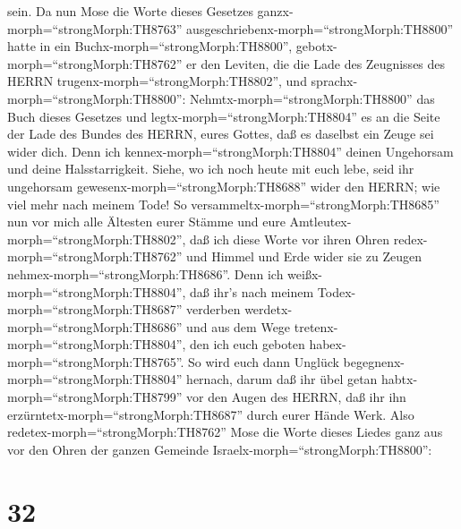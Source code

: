 sein.  Da nun Mose die Worte dieses Gesetzes
ganzx-morph=``strongMorph:TH8763''
ausgeschriebenx-morph=``strongMorph:TH8800'' hatte in ein
Buchx-morph=``strongMorph:TH8800'', 
gebotx-morph=``strongMorph:TH8762'' er den Leviten, die die Lade des
Zeugnisses des HERRN trugenx-morph=``strongMorph:TH8802'', und
sprachx-morph=``strongMorph:TH8800'': 
Nehmtx-morph=``strongMorph:TH8800'' das Buch dieses Gesetzes und
legtx-morph=``strongMorph:TH8804'' es an die Seite der Lade des Bundes
des HERRN, eures Gottes, daß es daselbst ein Zeuge sei wider dich.
 Denn ich kennex-morph=``strongMorph:TH8804'' deinen
Ungehorsam und deine Halsstarrigkeit. Siehe, wo ich noch heute mit euch
lebe, seid ihr ungehorsam gewesenx-morph=``strongMorph:TH8688'' wider
den HERRN; wie viel mehr nach meinem Tode!  So
versammeltx-morph=``strongMorph:TH8685'' nun vor mich alle Ältesten
eurer Stämme und eure Amtleutex-morph=``strongMorph:TH8802'', daß ich
diese Worte vor ihren Ohren redex-morph=``strongMorph:TH8762'' und
Himmel und Erde wider sie zu Zeugen nehmex-morph=``strongMorph:TH8686''.
 Denn ich weißx-morph=``strongMorph:TH8804'', daß ihr's
nach meinem Todex-morph=``strongMorph:TH8687'' verderben
werdetx-morph=``strongMorph:TH8686'' und aus dem Wege
tretenx-morph=``strongMorph:TH8804'', den ich euch geboten
habex-morph=``strongMorph:TH8765''. So wird euch dann Unglück
begegnenx-morph=``strongMorph:TH8804'' hernach, darum daß ihr übel getan
habtx-morph=``strongMorph:TH8799'' vor den Augen des HERRN, daß ihr ihn
erzürntetx-morph=``strongMorph:TH8687'' durch eurer Hände Werk.
 Also redetex-morph=``strongMorph:TH8762'' Mose die Worte
dieses Liedes ganz aus vor den Ohren der ganzen Gemeinde
Israelx-morph=``strongMorph:TH8800'':

\hypertarget{section-31}{%
\section{32}\label{section-31}}

